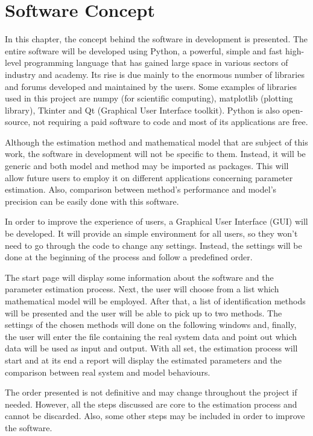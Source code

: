 \chapter{Software Concept}

\label{ch: software}

In this chapter, the concept behind the software in development is presented. The entire software will be developed using Python, a powerful, simple and fast high-level programming language that has gained large space in various sectors of industry and academy. Its rise is due mainly to the enormous number of libraries and forums developed and maintained by the users. Some examples of libraries used in this project are numpy (for scientific computing), matplotlib (plotting library), Tkinter and Qt (Graphical User Interface toolkit). Python is also open-source, not requiring a paid software to code and most of its applications are free.

Although the estimation method and mathematical model that are subject of this work, the software in development will not be specific to them. Instead, it will be generic and both model and method may be imported as packages. This will allow future users to employ it on different applications concerning parameter estimation. Also, comparison between method's performance and model's precision can be easily done with this software.

In order to improve the experience of users, a Graphical User Interface (GUI) will be developed. It will provide an simple environment for all users, so they won't need to go through the code to change any settings. Instead, the settings will be done at the beginning of the process and follow a predefined order.

The start page will display some information about the software and the parameter estimation process. Next, the user will choose from a list which mathematical model will be employed. After that, a list of identification methods will be presented and the user will be able to pick up to two methods. The settings of the chosen methods will done on the following windows and, finally, the user will enter the file containing the real system data and point out which data will be used as input and output. With all set, the estimation process will start and at its end a report will display the estimated parameters and the comparison between real system and model behaviours. 

The order presented is not definitive and may change throughout the project if needed. However, all the steps discussed are core to the estimation process and cannot be discarded. Also, some other steps may be included in order to improve the software.